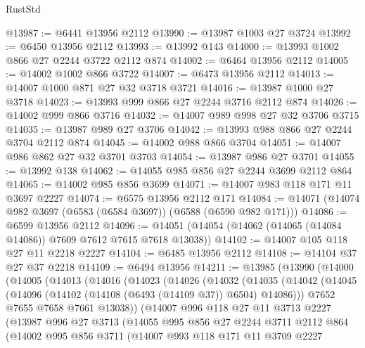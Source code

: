 \begin{lexlean}{RustStd}
\begin{coremodule}
@13987 := @6441 @13956 @2112
@13990 := @13987 @1003 @27 @3724
@13992 := @6450 @13956 @2112
@13993 := @13992 @143
@14000 := @13993 @1002 @866 @27 @2244 @3722 @2112 @874
@14002 := @6464 @13956 @2112
@14005 := @14002 @1002 @866 @3722
@14007 := @6473 @13956 @2112
@14013 := @14007 @1000 @871 @27 @32 @3718 @3721
@14016 := @13987 @1000 @27 @3718
@14023 := @13993 @999 @866 @27 @2244 @3716 @2112 @874
@14026 := @14002 @999 @866 @3716
@14032 := @14007 @989 @998 @27 @32 @3706 @3715
@14035 := @13987 @989 @27 @3706
@14042 := @13993 @988 @866 @27 @2244 @3704 @2112 @874
@14045 := @14002 @988 @866 @3704
@14051 := @14007 @986 @862 @27 @32 @3701 @3703
@14054 := @13987 @986 @27 @3701
@14055 := @13992 @138
@14062 := @14055 @985 @856 @27 @2244 @3699 @2112 @864
@14065 := @14002 @985 @856 @3699
@14071 := @14007 @983 @118 @171 @11 @3697 @2227
@14074 := @6575 @13956 @2112 @171
@14084 := @14071 (@14074 @982 @3697 (@6583 (@6584 @3697)) (@6588 (@6590 @982 @171)))
@14086 := @6599 @13956 @2112
@14096 := @14051 (@14054 (@14062 (@14065 (@14084 @14086)) @7609 @7612 @7615 @7618 @13038))
@14102 := @14007 @105 @118 @27 @11 @2218 @2227
@14104 := @6485 @13956 @2112
@14108 := @14104 @37 @27 @37 @2218
@14109 := @6494 @13956
@14211 := @13985
    (@13990
      (@14000
        (@14005
          (@14013
            (@14016
              (@14023
                (@14026
                  (@14032
                    (@14035
                      (@14042
                        (@14045 (@14096 (@14102 (@14108 (@6493 (@14109 @37)) @6504) @14086)))
                        @7652
                        @7655
                        @7658
                        @7661
                        @13038))
                    (@14007
                      @996
                      @118
                      @27
                      @11
                      @3713
                      @2227
                      (@13987
                        @996
                        @27
                        @3713
                        (@14055
                          @995
                          @856
                          @27
                          @2244
                          @3711
                          @2112
                          @864
                          (@14002
                            @995
                            @856
                            @3711
                            (@14007
                              @993
                              @118
                              @171
                              @11
                              @3709
                              @2227

\end{coremodule}
\end{lexlean}
